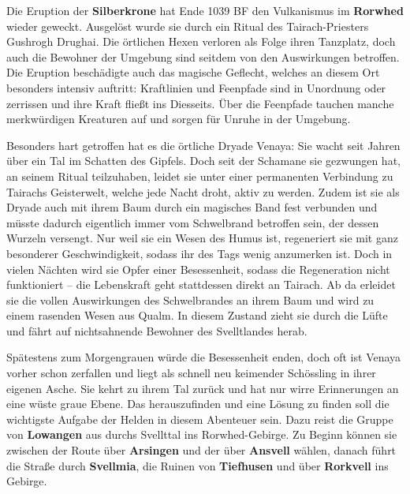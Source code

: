 \spaltenanfang



Die Eruption der \textbf{Silberkrone} hat Ende 1039 BF den Vulkanismus im \textbf{Rorwhed} wieder geweckt.
Ausgelöst wurde sie durch ein Ritual des Tairach-Priesters Gushrogh Drughai.
Die örtlichen Hexen verloren als Folge ihren Tanzplatz, doch auch die Bewohner der Umgebung sind seitdem von den Auswirkungen betroffen.
Die Eruption beschädigte auch das magische Geflecht, welches an diesem Ort besonders intensiv auftritt:
Kraftlinien und Feenpfade sind in Unordnung oder zerrissen und ihre Kraft fließt ins Diesseits.
Über die Feenpfade tauchen manche merkwürdigen Kreaturen auf und sorgen für Unruhe in der Umgebung.


Besonders hart getroffen hat es die örtliche Dryade Venaya:
Sie wacht seit Jahren über ein Tal im Schatten des Gipfels.
Doch seit der Schamane sie gezwungen hat, an seinem Ritual teilzuhaben, leidet sie unter einer permanenten Verbindung zu Tairachs Geisterwelt, welche jede Nacht droht, aktiv zu werden.
Zudem ist sie als Dryade auch mit ihrem Baum durch ein magisches Band fest verbunden und müsste dadurch eigentlich immer vom Schwelbrand betroffen sein, der dessen Wurzeln versengt.
Nur weil sie ein Wesen des Humus ist, regeneriert sie mit ganz besonderer Geschwindigkeit, sodass ihr des Tags wenig anzumerken ist.
Doch in vielen Nächten wird sie Opfer einer Besessenheit, sodass die Regeneration nicht funktioniert -- die Lebenskraft geht stattdessen direkt an Tairach.
Ab da erleidet sie die vollen Auswirkungen des Schwelbrandes an ihrem Baum und wird zu einem rasenden Wesen aus Qualm.
In diesem Zustand zieht sie durch die Lüfte und fährt auf nichtsahnende Bewohner des Svelltlandes herab.

\vfill

Spätestens zum Morgengrauen würde die Besessenheit enden, doch oft ist Venaya vorher schon zerfallen und liegt als schnell neu keimender Schössling in ihrer eigenen Asche.
Sie kehrt zu ihrem Tal zurück und hat nur wirre Erinnerungen an eine wüste graue Ebene.
Das herauszufinden und eine Lösung zu finden soll die wichtigste Aufgabe der Helden in diesem Abenteuer sein.
Dazu reist die Gruppe von \textbf{Lowangen} aus durchs Svellttal ins Rorwhed-Gebirge.
Zu Beginn können sie zwischen der Route über \textbf{Arsingen} und der über \textbf{Ansvell} wählen, danach führt die Straße durch \textbf{Svellmia}, die Ruinen von \textbf{Tiefhusen} und über \textbf{Rorkvell} ins Gebirge.

